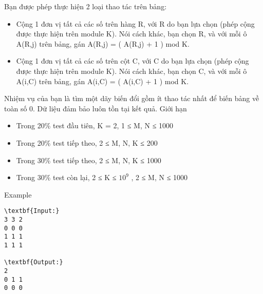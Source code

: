 Bạn được phép thực hiện 2 loại thao tác trên bảng:
\begin{itemize}
	\item Cộng 1 đơn vị tất cả các số trên hàng R, với R do bạn lựa chọn (phép cộng được thực hiện trên module K). Nói cách khác, bạn chọn R, và với mỗi ô A(R,j) trên bảng, gán A(R,j) = ( A(R,j) + 1 ) mod K.
	\item Cộng 1 đơn vị tất cả các số trên cột C, với C do bạn lựa chọn (phép cộng được thực hiện trên module K). Nói cách khác, bạn chọn C, và với mỗi ô A(i,C) trên bảng, gán A(i,C) = ( A(i,C) + 1 ) mod K.
\end{itemize}

Nhiệm vụ của bạn là tìm một dãy biến đổi gồm ít thao tác nhất để biến bảng về toàn số 0. Dữ liệu đảm bảo luôn tồn tại kết quả.
Giới hạn
\begin{itemize}
	\item Trong 20\% test đầu tiên, K = 2, 1 ≤ M, N ≤ 1000
	\item Trong 20\% test tiếp theo, 2 ≤ M, N, K ≤ 200
	\item Trong 30\% test tiếp theo, 2 ≤ M, N, K ≤ 1000
	\item Trong 30\% test còn lại, 2 ≤ K ≤ $10^{9}$ , 2 ≤ M, N ≤ 1000
\end{itemize}
Example
\begin{verbatim}
\textbf{Input:}
3 3 2
0 0 0
1 1 1
1 1 1

\textbf{Output:}
2
0 1 1
0 0 0\end{verbatim}